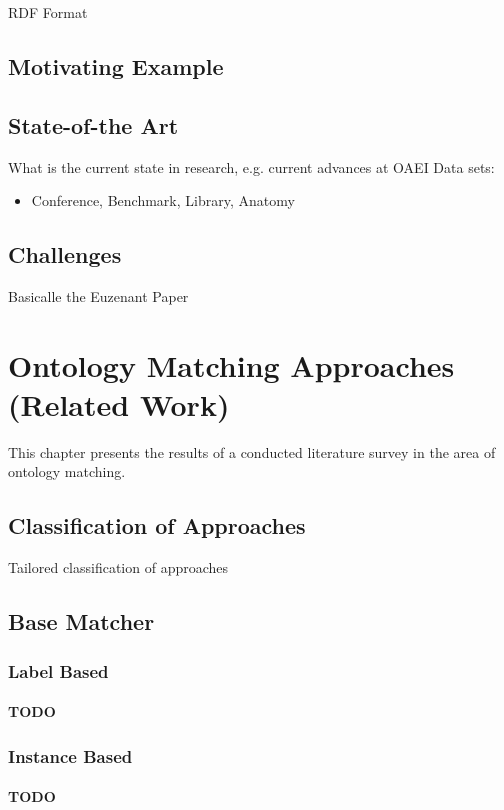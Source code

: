 \documentclass[11pt,titlepage,oneside,openany,a4paper]{report}
\begin{document}
RDF Format \cite{euzenat2004api}

\section{Motivating Example}
\label{sec:motivating_example}

\section{State-of-the Art}
\label{sec:state_of_the_art}
	What is the current state in research, e.g. current advances at OAEI
	Data sets:
	\begin{itemize}
	\item Conference, Benchmark, Library, Anatomy
	\end{itemize}
\section{Challenges}
\label{sec:challeng_ontology_matching}
	Basicalle the Euzenant Paper



\chapter{Ontology Matching Approaches (Related Work)}
This chapter presents the results of a conducted literature survey in the area of ontology matching.
\section{Classification of Approaches}
Tailored classification of approaches
\section{Base Matcher}

\subsection{Label Based}
 \subsubsection{TODO}
\subsection{Instance Based}
 \subsubsection{TODO}
\end{document}
